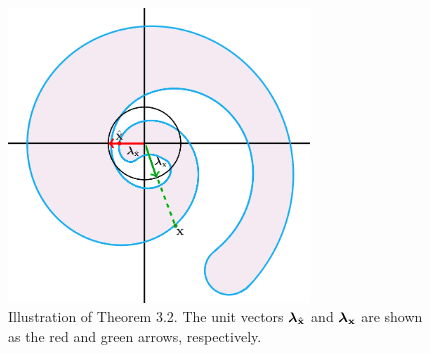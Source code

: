 \begin{figure}[h!]
\begin{center}
 	\includegraphics[width=8cm]{Figures/illustration.png}
\end{center}
\caption{Illustration of Theorem 3.2. The unit vectors $\boldsymbol{\lambda}_{\hat{\mathbf{x}}}$ and $\boldsymbol{\lambda}_{\mathbf{x}}$ are shown as the red and green arrows, respectively.}
\label{fig:illustration}
\end{figure}


